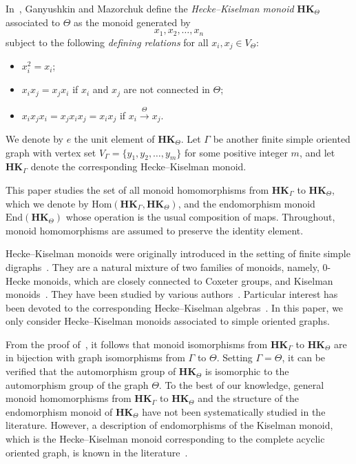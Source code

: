 \documentclass[pdflatex,sn-mathphys-num]{sn-jnl}
\newcommand{\hk}{\mathbf{HK}_{\Theta}}
\newcommand{\hkg}{\mathbf{HK}_{\Gamma}}
\newcommand{\tot}{\overset{\Theta}{\to}}
\theoremstyle{definition}
\theoremstyle{remark}
\begin{document}
In~\cite{ganyushkin11}, Ganyushkin and Mazorchuk define the \emph{Hecke--Kiselman monoid} $\hk$ associated to $\Theta$ as the monoid generated by
\[
x_1, x_2, \dots, x_n
\]
subject to the following \emph{defining relations} for all $x_i, x_j \in V_{\Theta}$:
\begin{itemize}
    \item $x_i^2 = x_i$;
    \item $x_i x_j = x_j x_i$ if $x_i$ and $x_j$ are not connected in $\Theta$;
    \item $x_i x_j x_i = x_j x_i x_j = x_i x_j$ if $x_i \tot x_j$.
\end{itemize}
We denote by $e$ the unit element of $\hk$.
Let $\Gamma$ be another finite simple oriented graph with vertex set $V_{\Gamma} = \{y_1, y_2, \dots, y_m\}$ for some positive integer $m$,
and let $\hkg$ denote the corresponding Hecke--Kiselman monoid.

This paper studies the set of all monoid homomorphisms from $\hkg$ to $\hk$, which we denote by $\mathrm{Hom}(\hkg, \hk)$, and the endomorphism monoid $\mathrm{End}(\hk)$ whose operation is the usual composition of maps.
Throughout, monoid homomorphisms are assumed to preserve the identity element.

Hecke--Kiselman monoids were originally introduced in the setting of finite simple digraphs~\cite{ganyushkin11}.
They are a natural mixture of two families of monoids, namely, 0-Hecke monoids, which are closely connected to Coxeter groups, and Kiselman monoids~\cite{kiselman,kudryavtseva}.
They have been studied by various authors~\cite{aragona13, aragona20, Ashikhmin15, collina, forsberg2017, ganyushkin11, Lebed2025, wiertel24}.
Particular interest has been devoted to the corresponding Hecke--Kiselman algebras~\cite{okninski20,okninski21,wiertel22,wiertel23}.
In this paper, we only consider Hecke--Kiselman monoids associated to simple oriented graphs.

From the proof of~\cite[Theorem~16]{ganyushkin11}, it follows that monoid isomorphisms from $\hkg$ to $\hk$ are in bijection with graph isomorphisms from $\Gamma$ to $\Theta$.
Setting $\Gamma = \Theta$, it can be verified that the automorphism group of $\hk$ is isomorphic to the automorphism group of the graph $\Theta$.
To the best of our knowledge, general monoid homomorphisms from $\hkg$ to $\hk$ and the structure of the endomorphism monoid of $\hk$ have not been systematically studied in the literature.
However, a description of endomorphisms of the Kiselman monoid, which is the Hecke--Kiselman monoid corresponding to the complete acyclic oriented graph, is known in the literature~\cite{andrensek}.
\end{document}
